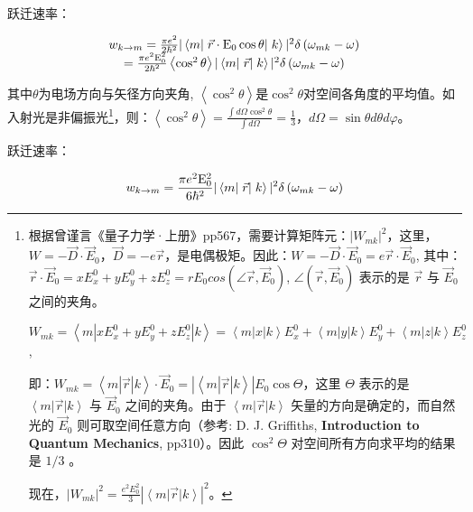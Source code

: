 跃迁速率：

\begin{equation}\label{25-6}
\begin{array}{c}
w_{k \to m}  = \frac{{\pi e^2 }}{{2\hbar ^2 }} | \left\langle m
\right|\left. { {\vec r} \cdot {\rm E}_0 \cos \theta } \right|\left.
k \right\rangle |^2 \delta \left( {\omega _{mk}  - \omega } \right) \\
= \frac{{\pi e^2 {\rm E}_0^2 }}{{2\hbar ^2 }}\left\langle {\cos ^2
\theta } \right\rangle | \left\langle m \right|\left. {\vec r}
\right|\left. k \right\rangle |^2 \delta \left( {\omega _{mk}  -
\omega } \right) \\
\end{array}
\end{equation}


其中$\theta$为电场方向与矢径方向夹角, $\left\langle {\cos ^2 \theta
} \right\rangle $是$\cos ^2 \theta
$对空间各角度的平均值。如入射光是非偏振光\footnote{根据曾谨言《量子力学·上册》pp567，需要计算矩阵元：$|W_{mk}|^2$，这里，$W=-\vec{D}\cdot
\vec{E}_0$，$\vec{D}=-e \vec{r}$，是电偶极矩。因此：$W=-\vec{D}
\cdot \vec{E}_0 = e \vec{r} \cdot \vec{E}_0$, 其中：$\vec{r} \cdot
\vec{E}_0 = x E_x^0 + y E_y^0 + z E_z^0 = r E_0 cos (\angle \vec{r},
\vec{E}_0)$, $\angle(\vec{r}, \vec{E}_0)$ 表示的是 $\vec{r}$ 与
$\vec{E}_0$ 之间的夹角。


$W_{mk} = \left<m|x E_x^0 + y E_y^0 + z E_z^0|k\right> =
\left<m|x|k\right>E_x^0 + \left<m|y|k\right>E_y^0 +
\left<m|z|k\right>E_z^0$,

即：$W_{mk} = \left<m|\vec{r}|k\right> \cdot \vec{E}_0 =
|\left<m|\vec{r}|k\right>| E_0 \cos \Theta$，这里 $\Theta$ 表示的是
${\left\langle {m} \right|\vec r\left| k \right\rangle }$ 与
$\vec{E}_0$ 之间的夹角。由于 ${\left\langle {m} \right|\vec r\left|
k \right\rangle }$ 矢量的方向是确定的，而自然光的 $\vec{E}_0$
则可取空间任意方向（参考: D. J. Griffiths, \textbf{Introduction to
Quantum Mechanics}, pp310）。因此 $\cos^2 \Theta$
对空间所有方向求平均的结果是 $1/3$ 。

现在，$\left| {W_{mk} } \right|^2  = \frac{{e^2 E_0^2 }}{3}\left|
{\left\langle {m} \right|\vec r\left| k \right\rangle } \right|^2
$。

}，则：$\left\langle {\cos ^2 \theta } \right\rangle  = \frac{{\int
{d\Omega \cos ^2 \theta } }}{{\int {d\Omega } }} =
\frac{1}{3}$，$d\Omega  = \sin \theta d\theta d\varphi $。

跃迁速率：

\begin{equation}\label{25-7}
w_{k \to m}  = \frac{{\pi e^2 {\rm E}_0^2 }}{{6\hbar ^2 }} |
\left\langle m \right|\left. {\vec r} \right|\left. k \right\rangle
|^2 \delta \left( {\omega _{mk}  - \omega } \right)
\end{equation}

